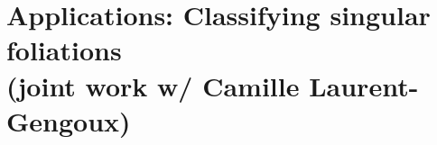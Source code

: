 \documentclass[hyperref={pdfpagelabels=false}]{beamer}
\def\bas#1\eas{\begin{align*}#1\end{align*}}
\theoremstyle{plain}
\theoremstyle{remark}
\newtheorem*{remark}{Remarks}
\begin{document}
%
%
%
%
%




{
\section[Foliations]{Applications: Classifying singular foliations \\(joint work w/ Camille Laurent-Gengoux)}
}
\end{document}

